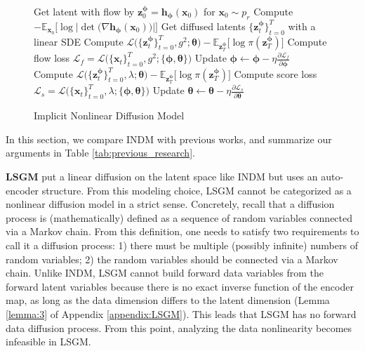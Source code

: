 \documentclass{article}
\theoremstyle{definition}
\theoremstyle{remark}
\begin{document}
	\begin{wrapfigure}{R}{0.59\textwidth}
		\vskip -0.63in
		\begin{minipage}{0.59\textwidth}
			\begin{algorithm}[H]
				\centering
				\caption{Implicit Nonlinear Diffusion Model}\label{alg:INDM}
				\begin{algorithmic}[1]
					\Repeat
					\State Get latent with flow by $\mathbf{z}_{0}^{\bm{\phi}}=\mathbf{h}_{\bm{\phi}}(\mathbf{x}_{0})$ for $\mathbf{x}_{0}\sim p_{r}$ 
					\State Compute $-\mathbb{E}_{\mathbf{x}_{0}}\big[\log{\big\vert\det\big(\nabla\mathbf{h}_{\bm{\phi}}(\mathbf{x}_{0})\big)\big\vert}\big]$
					\State Get diffused latents $\{\mathbf{z}_{t}^{\bm{\phi}}\}_{t=0}^{T}$ with a linear SDE
					\State Compute $\mathcal{L}\big(\{\mathbf{z}_{t}^{\bm{\phi}}\}_{t=0}^{T},g^{2};\bm{\theta}\big)-\mathbb{E}_{\mathbf{z}_{T}^{\bm{\phi}}}\big[\log{\pi(\mathbf{z}_{T}^{\bm{\phi}})}\big]$
					\State Compute flow loss $\mathcal{L}_{f}=\mathcal{L}\big(\{\mathbf{x}_{t}\}_{t=0}^{T},g^{2};\{\bm{\phi},\bm{\theta}\}\big)$
					\State Update $\bm{\phi}\leftarrow \bm{\phi}-\eta\frac{\partial\mathcal{L}_{f}}{\partial\bm{\phi}}$
					\State Compute $\mathcal{L}\big(\{\mathbf{z}_{t}^{\bm{\phi}}\}_{t=0}^{T},\lambda;\bm{\theta}\big)-\mathbb{E}_{\mathbf{z}_{T}^{\bm{\phi}}}\big[\log{\pi(\mathbf{z}_{T}^{\bm{\phi}})}\big]$
					\State Compute score loss $\mathcal{L}_{s}=\mathcal{L}\big(\{\mathbf{x}_{t}\}_{t=0}^{T},\lambda;\{\bm{\phi},\bm{\theta}\}\big)$
					\State Update $\bm{\theta}\leftarrow \bm{\theta}-\eta\frac{\partial\mathcal{L}_{s}}{\partial\bm{\theta}}$
				\end{algorithmic}
			\end{algorithm}
		\end{minipage}
		\vskip -0.2in
	\end{wrapfigure}
	In this section, we compare INDM with previous works, and summarize our arguments in Table \ref{tab:previous_research}.
	
	\textbf{LSGM} \citet{vahdat2021score} put a linear diffusion on the latent space like INDM but uses an auto-encoder structure. From this modeling choice, LSGM cannot be categorized as a nonlinear diffusion model in a strict sense. Concretely, recall that a diffusion process is (mathematically) defined as a sequence of random variables connected via a Markov chain. From this definition, one needs to satisfy two requirements to call it a diffusion process: 1) there must be multiple (possibly infinite) numbers of random variables; 2) the random variables should be connected via a Markov chain. Unlike INDM, LSGM cannot build forward data variables from the forward latent variables because there is no exact inverse function of the encoder map, as long as the data dimension differs to the latent dimension (Lemma \ref{lemma:3} of Appendix \ref{appendix:LSGM}). This leads that LSGM has no forward data diffusion process. From this point, analyzing the data nonlinearity becomes infeasible in LSGM.
	
\end{document}
